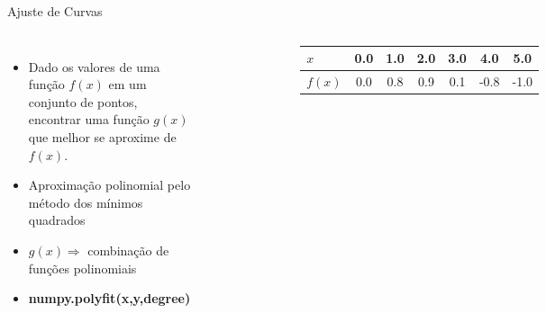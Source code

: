 \documentclass[12pt,t,graphics]{beamer}
\begin{document}
\begin{frame}[t,fragile]{Ajuste de Curvas}
	\begin{columns}
		\begin{itemize}
			\item Dado os valores de uma função $f(x)$ em um conjunto de pontos,
			encontrar uma função $g(x)$ que melhor se aproxime de $f(x)$.
			\item Aproximação polinomial pelo método dos mínimos quadrados
			\item $g(x) \Rightarrow $ combinação de funções polinomiais
			\item \textbf{numpy.polyfit(x,y,degree)}
		\end{itemize}
		\begin{figure}
			\centering
			\includegraphics[scale=0.25]{img/ac_dados.png}
		\end{figure}
		\begin{tiny}
			\begin{table}
				\centering
				\begin{tabular}[c]{|l||cccccc|}
					\hline
					$x$ & 0.0 & 1.0& 2.0& 3.0& 4.0& 5.0 \\
					\hline
					$f(x)$ & 0.0 & 0.8 & 0.9 & 0.1 & -0.8 & -1.0\\
					\hline
				\end{tabular}
			\end{table}
		\end{tiny}
	\end{columns}
\end{frame}
\end{document}
